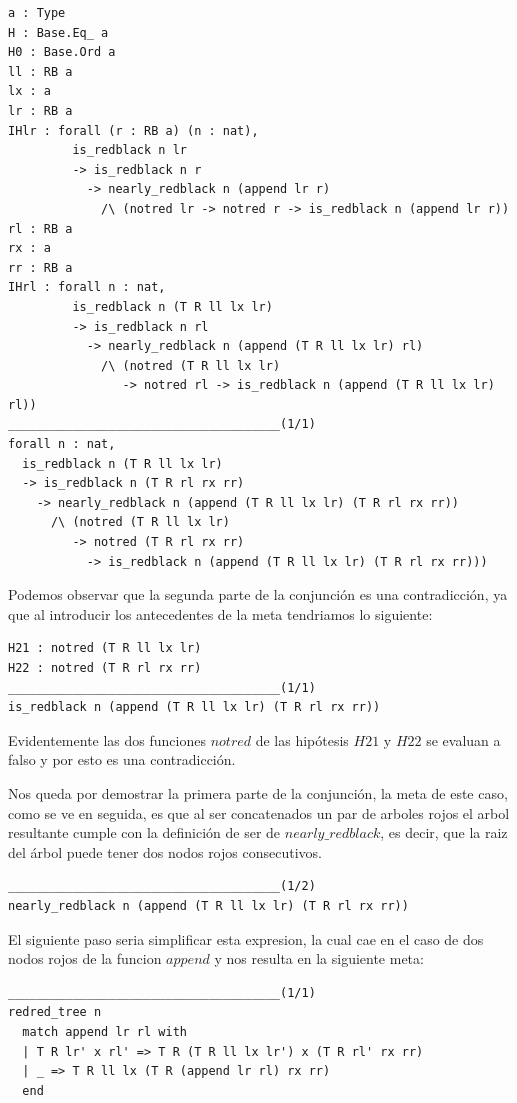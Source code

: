 \documentclass[8pt,leqno,pdflatex,spanish]{book}
\theoremstyle{plain}
\theoremstyle{definition}
\theoremstyle{remark}
\begin{document}
\begin{verbatim}
a : Type
H : Base.Eq_ a
H0 : Base.Ord a
ll : RB a
lx : a
lr : RB a
IHlr : forall (r : RB a) (n : nat),
         is_redblack n lr
         -> is_redblack n r
           -> nearly_redblack n (append lr r)
             /\ (notred lr -> notred r -> is_redblack n (append lr r))
rl : RB a
rx : a
rr : RB a
IHrl : forall n : nat,
         is_redblack n (T R ll lx lr)
         -> is_redblack n rl
           -> nearly_redblack n (append (T R ll lx lr) rl)
             /\ (notred (T R ll lx lr)
                -> notred rl -> is_redblack n (append (T R ll lx lr) rl))
______________________________________(1/1)
forall n : nat,
  is_redblack n (T R ll lx lr)
  -> is_redblack n (T R rl rx rr)
    -> nearly_redblack n (append (T R ll lx lr) (T R rl rx rr))
      /\ (notred (T R ll lx lr)
         -> notred (T R rl rx rr)
           -> is_redblack n (append (T R ll lx lr) (T R rl rx rr)))
\end{verbatim}

Podemos observar que la segunda parte de la conjunci\'on es una contradicci\'on, ya que al 
introducir los antecedentes de la meta tendriamos lo siguiente:

\begin{verbatim}
H21 : notred (T R ll lx lr)
H22 : notred (T R rl rx rr)
______________________________________(1/1)
is_redblack n (append (T R ll lx lr) (T R rl rx rr))
\end{verbatim}

Evidentemente las dos funciones $notred$ de las hip\'otesis $H21$ y $H22$ se evaluan a falso y por 
esto es una contradicci\'on.

Nos queda por demostrar la primera parte de la conjunci\'on, la meta de este caso, como se ve en 
seguida, es que al ser concatenados un par de arboles rojos el arbol resultante cumple con la 
definici\'on de ser de $nearly\_redblack$, es decir, que la raiz del \'arbol puede tener dos nodos 
rojos consecutivos.

\begin{verbatim}
______________________________________(1/2)
nearly_redblack n (append (T R ll lx lr) (T R rl rx rr))
\end{verbatim}

El siguiente paso seria simplificar esta expresion, la cual cae en el caso de dos nodos rojos de la funcion $append$ y nos resulta en la siguiente meta:

\begin{verbatim}
______________________________________(1/1)
redred_tree n
  match append lr rl with
  | T R lr' x rl' => T R (T R ll lx lr') x (T R rl' rx rr)
  | _ => T R ll lx (T R (append lr rl) rx rr)
  end
\end{verbatim}
\end{document}
